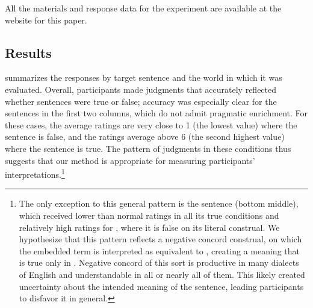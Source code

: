 \documentclass[leqno,12pt]{article}
\begin{document}
All the materials and response data for the experiment are available at
the website for this paper.


\subsection{Results}\label{sec:exp1:results}

 summarizes the responses by target sentence
and the world in which it was evaluated. Overall, participants made
judgments that accurately reflected whether sentences were true or
false; accuracy was especially clear for the sentences in the first
two columns, which do not admit pragmatic enrichment. For these cases,
the average ratings are very close to 1 (the lowest
value) where the sentence is false, and the ratings average above 6
(the second highest value) where the sentence is true. The pattern of
judgments in these conditions thus suggests that our method is
appropriate for measuring participants' interpretations.\footnote{The
  only exception to this general pattern is the sentence  (bottom middle), which received
  lower than normal ratings in all its true conditions and relatively
  high ratings for , where it is false on its literal
  construal. We hypothesize that this pattern reflects a negative
  concord construal, on which the embedded term is interpreted as
  equivalent to , creating a meaning that is
  true only in . Negative concord of this sort is
  productive in many dialects of English and understandable in all or
  nearly all of them. This likely created uncertainty about the
  intended meaning of the sentence, leading participants to disfavor
  it in general.}
\end{document}

